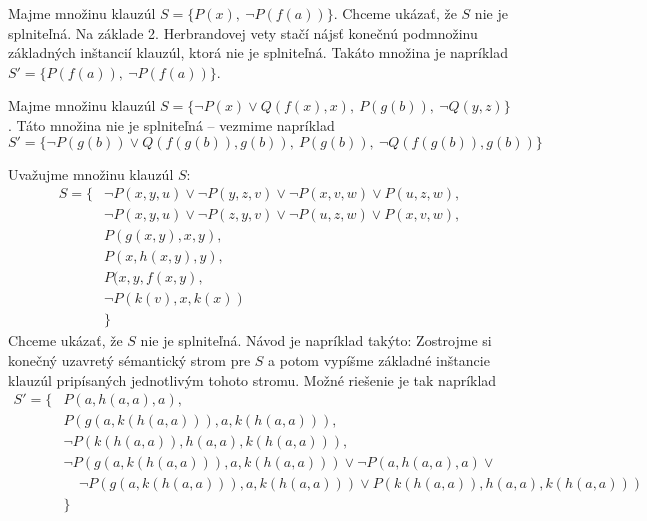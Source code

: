 \begin{priklad}
    Majme množinu klauzúl $S=\{P(x),\ \neg P(f(a))\}$.
    Chceme ukázať, že $S$ nie je splniteľná.
    Na základe 2. Herbrandovej vety stačí nájsť konečnú podmnožinu
    základných inštancií klauzúl, ktorá nie je splniteľná.
    Takáto množina je napríklad $S' = \{ P(f(a)),\ \neg P(f(a))\}$.
\end{priklad}

\begin{priklad}
    Majme množinu klauzúl $S=\{\neg P(x) \lor Q(f(x),x),\
        P(g(b)),\ \neg Q(y,z) \}$.
    Táto množina nie je splniteľná -- vezmime napríklad
    \begin{equation*}
        S' = \{ \neg P(g(b)) \lor Q(f(g(b)), g(b)),\ P(g(b)),\ 
                \neg Q(f(g(b)), g(b)) \}
    \end{equation*}
\end{priklad}

\begin{priklad}
    Uvažujme množinu klauzúl $S$:
    \begin{equation*}
    \begin{split}
        S = \big\{& \neg P(x,y,u) \lor \neg P(y,z,v) \lor 
                    \neg P(x,v,w) \lor P(u,z,w), \\
	         & \neg P(x,y,u) \lor \neg P(z,y,v) \lor
                    \neg P(u,z,w) \lor P(x,v,w), \\
	         & P(g(x,y),x,y), \\
                 & P(x,h(x,y),y), \\
                 & P(x,y,f(x,y), \\
                 & \neg P(k(v),x,k(x)) \\
                 & \big\}
    \end{split}
    \end{equation*}
    Chceme ukázať, že $S$ nie je splniteľná. Návod je napríklad
    takýto: Zostrojme si konečný uzavretý sémantický strom pre $S$
    a potom vypíšme základné inštancie klauzúl pripísaných jednotlivým
    \fixme{cestám} tohoto stromu.
    Možné riešenie je tak napríklad
    \begin{equation*}
    \begin{split}
        S' = \big\{& P(a,h(a,a),a), \\
                   & P(g(a,k(h(a,a))),a,k(h(a,a))),\\
                   & \neg P(k(h(a,a)),h(a,a),k(h(a,a))),\\
                   & \neg P(g(a,k(h(a,a))),a,k(h(a,a))) \lor
                    \neg P(a,h(a,a),a) \lor \\ & \phantom{\lor}
                    \neg P(g(a,k(h(a,a))),a,k(h(a,a))) \lor
                    P(k(h(a,a)),h(a,a),k(h(a,a))) \\
                &\big\}
    \end{split}
    \end{equation*}
\end{priklad}

